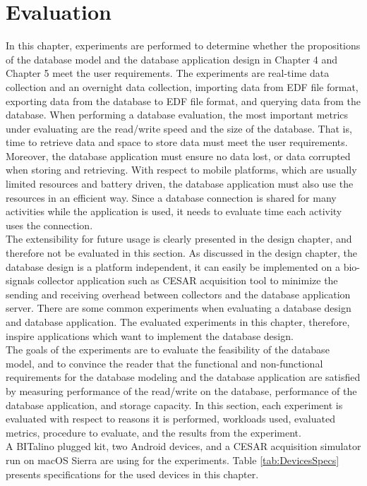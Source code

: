 
\chapter{Evaluation}%

\label{Chapter6} %
In this chapter, experiments are performed to determine whether the propositions of the database model and the database application design in Chapter 4 and Chapter 5 meet the user requirements. The experiments are real-time data collection and an overnight data collection, importing data from EDF file format, exporting data from the database to EDF file format, and querying data from the database. When performing a database evaluation, the most important metrics under evaluating are the read/write speed and the size of the database. That is, time to retrieve data and space to store data must meet the user requirements. Moreover, the database application must ensure no data lost, or data corrupted when storing and retrieving. With respect to mobile platforms, which are usually limited resources and battery driven, the database application must also use the resources in an efficient way. Since a database connection is shared for many activities while the application is used, it needs to evaluate time each activity uses the connection.\\
The extensibility for future usage is clearly presented in the design chapter, and therefore not be evaluated in this section. As discussed in the design chapter, the database design is a platform independent, it can easily be implemented on a bio-signals collector application such as CESAR acquisition tool to minimize the sending and receiving overhead between collectors and the database application server. There are some common experiments when evaluating a database design and database application. The evaluated experiments in this chapter, therefore, inspire applications which want to implement the database design.\\
The goals of the experiments are to evaluate the feasibility of the database model, and to convince the reader that the functional and non-functional requirements for the database modeling and the database application are satisfied by measuring performance of the read/write on the database, performance of the database application, and storage capacity. In this section, each experiment is evaluated with respect to reasons it is performed, workloads used, evaluated metrics, procedure to evaluate, and the results from the experiment.\\
A BITalino plugged kit, two Android devices, and a CESAR acquisition simulator run on macOS Sierra are using for the experiments. Table \ref{tab:DevicesSpecs} presents specifications for the used devices in this chapter.
